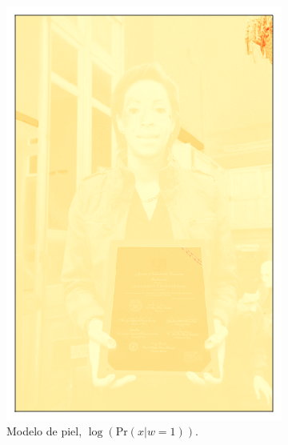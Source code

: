 \newpage
\begin{figure}[ht!]
    \centering
    \begin{subfigure}[t]{0.2\textwidth}
        \centering
        \includegraphics[width=\textwidth]{../figures/image2/image_02_distskin.png}
        \caption{Modelo de piel, $\log(\text{Pr}(x | w=1))$.}
    \end{subfigure}
    \hspace{0.25cm}
    \begin{subfigure}[t]{0.2\textwidth}
        \centering

\end{subfigure}
\end{figure}
